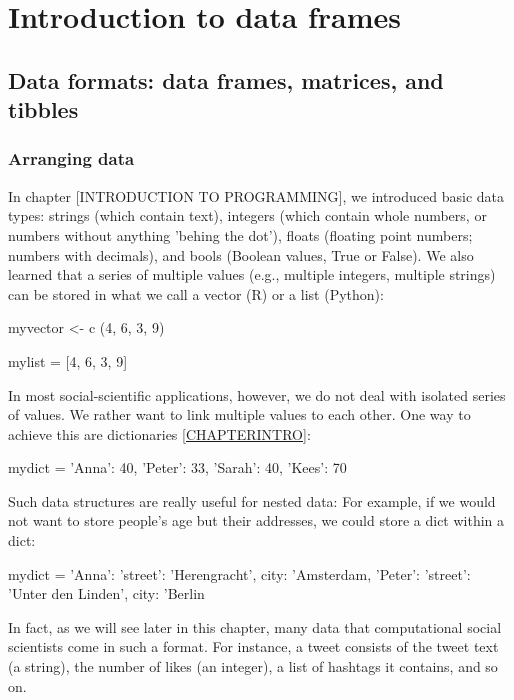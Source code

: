 \chapter{Introduction to data frames}

\section{Data formats: data frames, matrices, and tibbles}

\subsection{Arranging data}

In chapter [INTRODUCTION TO PROGRAMMING], we introduced basic data types: strings (which contain text), integers (which contain whole numbers, or numbers without anything 'behing the dot'), floats (floating point numbers; numbers with decimals), and bools (Boolean values, True or False). 
We also learned that a series of multiple values (e.g., multiple integers, multiple strings) can be stored in what we call a vector (R) or a list (Python):
\begin{exampler}
myvector <- c (4, 6, 3, 9)
\end{exampler}

\begin{examplepy}
mylist = [4, 6, 3, 9]
\end{examplepy}

In most social-scientific applications, however, we do not deal with isolated series of values. We rather want to link multiple values to each other. One way to achieve this are dictionaries \ref{CHAPTERINTRO}:

\begin{examplepy}
mydict = {'Anna': 40, 'Peter': 33, 'Sarah': 40, 'Kees': 70}
\end{examplepy}

Such data structures are really useful for nested data: For example, if we would not want to store people's age but their addresses, we could store a dict within a dict:

\begin{examplepy}
mydict = {'Anna': {'street': 'Herengracht', city: 'Amsterdam}, 'Peter': {'street': 'Unter den Linden', city: 'Berlin} }
\end{examplepy}

In fact, as we will see later in this chapter, many data that computational social scientists come in such a format. For instance, a tweet consists of the tweet text (a string), the number of likes (an integer), a list of hashtags it contains, and so on.

